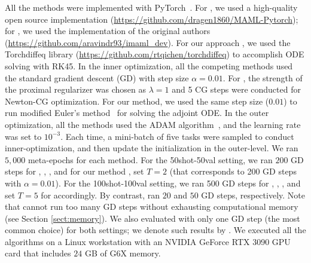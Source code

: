 All the methods were implemented with PyTorch~\citep{paszke2019pytorch}. For \maml, we used a high-quality open source implementation ({\url{https://github.com/dragen1860/MAML-Pytorch}}); for \imaml, we used the  implementation of the original authors ({\url{https://github.com/aravindr93/imaml_dev}}). For our approach \ours, we used the Torchdiffeq library ({\url{https://github.com/rtqichen/torchdiffeq}}) to accomplish ODE solving with RK45. In the inner optimization, all the competing methods used the standard gradient descent (GD) with step size $\alpha = 0.01$. For \imaml, the strength of the proximal regularizer was chosen as $\lambda=1$  and 5 CG steps were conducted for Newton-CG optimization.  For our method, we used the same step size (\ie $0.01$) to run modified Euler's method~\citep{ascher1998computer} for solving the adjoint ODE. 
In the outer optimization, all the methods used the ADAM algorithm~\citep{kingma2014adam}, and the learning rate was set to $10^{-3}$. Each time, a mini-batch of five tasks were sampled to conduct inner-optimization, and then update the initialization in the outer-level. We ran $5,000$ meta-epochs for each method.  For the 50shot-50val setting, we ran $200$ GD steps for \fomaml, \rap, \imaml, and for our method \ours, set $T=2$ (that corresponds to 200 GD steps with $\alpha=0.01$). For the 100shot-100val setting, we ran 500 GD steps for \fomaml, \rap, \imaml, and set $T=5$ for \ours accordingly. By contrast, \maml ran $20$ and $50$ GD steps, respectively. Note that \maml cannot run too many GD steps without exhausting computational memory (see Section \ref{sect:memory}). We also evaluated \maml with only one GD step (the most common choice) for both settings; we denote such results by . 
We executed all the algorithms  on a Linux workstation with an NVIDIA GeForce RTX 3090 GPU card that includes $24$ GB of G6X memory. 

